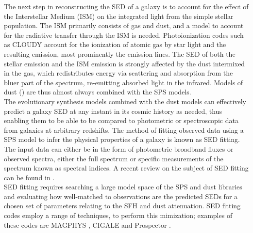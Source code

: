 The next step in reconstructing the SED of a galaxy is to account for
the effect of the Interstellar Medium (ISM) on the integrated light
from the simple stellar population. The ISM primarily consists of gas
and dust, and a model to account for the radiative transfer through
the ISM is needed. Photoionization codes such as CLOUDY
\citep{2013RMxAA..49..137F} account for the ionization of atomic gas
by star light and the resulting emission, most prominently the
emission lines. The SED of both the stellar emission and the ISM
emission is strongly affected by the dust intermixed in the gas, which
redistributes energy via scattering and absorption from the bluer part
of the spectrum, re-emitting absorbed light in the infrared. Models of
dust (\citealt{calzetti_calibration_2007, 2007ApJ...657..810D}) are
thus almost always combined with the SPS models.\\

The evolutionary synthesis models combined with the dust models can
effectively predict a galaxy SED at any instant in its cosmic history
as needed, thus enabling them to be able to be compared to photometric
or spectroscopic data from galaxies at arbitrary redshifts. The method
of fitting observed data using a SPS model to infer the physical
properties of a galaxy is known as SED fitting. The input data can
either be in the form of photometric broadband fluxes or observed
spectra, either the full spectrum or specific measurements of the
spectrum known as spectral indices. A recent review on the subject of
SED fitting can be found in \citet{conroy_modeling_2013}.\\

SED fitting requires searching a large model space of the SPS 
and dust libraries and evaluating how well-matched to observations
are the predicted SEDs for  a chosen  set of parameters relating 
to the SFH and dust attenuation. SED fitting codes
employ a range of techniques, to perform this 
mimization; examples of these codes are  MAGPHYS 
\citep{da_cunha_simple_2008}, CIGALE \citep{2009AandA...507.1793N} and 
Prospector \citep{2017ApJ...837..170L}.\\


